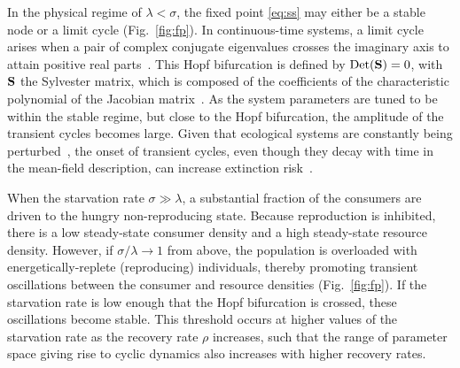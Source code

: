 \documentclass[twocolumn,preprintnumbers,amsmath,amssymb,superscriptaddress]{revtex4}
\begin{document}
In the physical regime of $\lambda<\sigma$, the fixed point \eqref{eq:ss} may either be a stable node or a limit cycle (Fig.~\ref{fig:fp}).
In continuous-time systems, a limit cycle arises when a pair of complex conjugate eigenvalues crosses the imaginary axis to attain positive real parts~\citep{GuckHolmes}.
This Hopf bifurcation is defined by ${\rm Det}({\bf S}) = 0$, with $\bf S$ the Sylvester matrix, which is composed of the coefficients of the characteristic polynomial of the Jacobian matrix~\citep{Gross:2004p2428}.
As the system parameters are tuned to be within the stable regime, but close to the Hopf bifurcation, the amplitude of the transient cycles becomes large.
Given that ecological systems are constantly being perturbed~\citep{Hastings:2001jh}, the onset of transient cycles, even though they decay with time in the mean-field description, can increase extinction risk~\citep{Neubert:1997wk,Caswell:2005eo,Neubert:2009td}.

When the starvation rate $\sigma\gg\lambda$, a substantial fraction of the
consumers are driven to the hungry non-reproducing state.  Because
reproduction is inhibited, there is a low steady-state consumer density and a
high steady-state resource density.  However, if $\sigma/\lambda\to 1$ from
above, the population is overloaded with energetically-replete (reproducing)
individuals, thereby promoting transient oscillations between the consumer
and resource densities (Fig.~\ref{fig:fp}).  If the starvation rate is low
enough that the Hopf bifurcation is crossed, these oscillations become
stable.  This threshold occurs at higher values of the starvation rate as the recovery rate $\rho$ increases, such that the range of parameter space giving rise to cyclic dynamics also increases with higher recovery rates.\\

\end{document}
